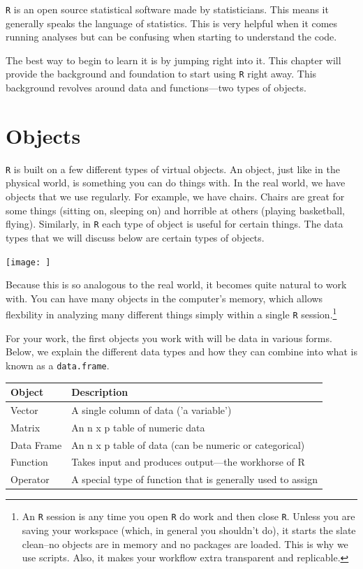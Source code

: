 \documentclass[]{tufte-book}
\theoremstyle{definition}
\theoremstyle{definition}
\theoremstyle{remark}
\begin{document}
\texttt{R} is an open source statistical software made by statisticians.
This means it generally speaks the language of statistics. This is very
helpful when it comes running analyses but can be confusing when
starting to understand the code.

The best way to begin to learn it is by jumping right into it. This
chapter will provide the background and foundation to start using
\texttt{R} right away. This background revolves around data and
functions---two types of objects.

\section*{Objects}\label{objects}

\texttt{R} is built on a few different types of virtual objects. An
object, just like in the physical world, is something you can do things
with. In the real world, we have objects that we use regularly. For
example, we have chairs. Chairs are great for some things (sitting on,
sleeping on) and horrible at others (playing basketball, flying).
Similarly, in \texttt{R} each type of object is useful for certain
things. The data types that we will discuss below are certain types of
objects.

\texttt{[image: ]}

Because this is so analogous to the real world, it becomes quite natural
to work with. You can have many objects in the computer's memory, which
allows flexbility in analyzing many different things simply within a
single \texttt{R} session.\footnote{An \texttt{R} session is any time
  you open \texttt{R} do work and then close \texttt{R}. Unless you are
  saving your workspace (which, in general you shouldn't do), it starts
  the slate clean--no objects are in memory and no packages are loaded.
  This is why we use scripts. Also, it makes your workflow extra
  transparent and replicable.}

For your work, the first objects you work with will be data in various
forms. Below, we explain the different data types and how they can
combine into what is known as a \texttt{data.frame}.

\begin{tabular}{l|l}
\hline
Object & Description\\
\hline
Vector & A single column of data ('a variable')\\
\hline
Matrix & An n x p table of numeric data\\
\hline
Data Frame & An n x p table of data (can be numeric or categorical)\\
\hline
Function & Takes input and produces output---the workhorse of R\\
\hline
Operator & A special type of function that is generally used to assign\\
\hline
\end{tabular}
\end{document}
